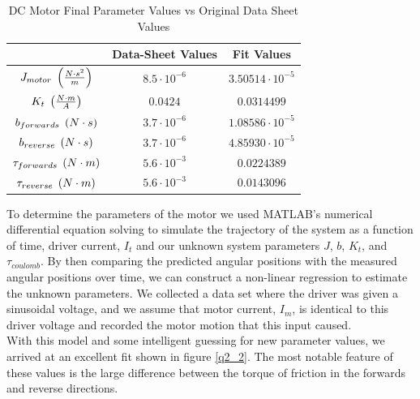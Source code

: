 \documentclass{article}
\theoremstyle{plain}
\theoremstyle{definition}
\theoremstyle{remark}
\begin{document}
\begin{table}[htb]
\begin{center}
    \begin{tabular}{|c|c|c|}
        \hline
        ~                 & Data-Sheet Values    & Fit Values              \\ \hline
        $J_{motor} \hspace{0.1cm} \left( \frac{N \cdot s^2}{m} \right)$               & $8.5 \cdot 10^{-6} $     & $3.50514 \cdot 10^{-5}$ \\ 
        $K_{t} \hspace{0.1cm} \left( \frac{N\cdot m}{A} \right)$           & $0.0424$             & $0.0314499$             \\ 
        $b_{forwards} \hspace{0.1cm} \left( N \cdot s \right)$    & $3.7 \cdot 10^{-6} $ & $1.08586 \cdot 10^{-5}$ \\ 
        $b_{reverse} \hspace{0.1cm} \left( N \cdot s \right)$     & $3.7 \cdot 10^{-6} $ & $4.85930 \cdot 10^{-5}$ \\ 
        $\tau_{forwards} \hspace{0.1cm} \left( N \cdot m \right)$ & $5.6 \cdot 10^{-3}$  & $0.0224389$             \\ 
        $\tau_{reverse} \hspace{0.1cm} \left( N \cdot m \right)$   & $5.6 \cdot 10^{-3}$  & $0.0143096$             \\
        \hline
    \end{tabular}
\caption{DC Motor Final Parameter Values vs Original Data Sheet Values}
\label{q2_1}
\end{center}
\end{table}

To determine the parameters of the motor we used MATLAB's numerical differential equation solving to simulate the trajectory of the system as a function of time, driver current, $I_t$ and our unknown system parameters $J$, $b$, $K_t$, and $\tau_{coulomb}$.  By then
comparing the predicted angular positions with the measured angular positions over time, we can construct a non-linear regression to estimate the unknown parameters.  We collected a data set where the driver was given a sinusoidal voltage, and we assume that motor current, $I_m$, is identical to this driver voltage and recorded the motor motion that this input caused. \\

With this model and some intelligent guessing for new parameter values, we arrived at an excellent fit shown in figure \ref{q2_2}. The most notable feature of these values is the large difference between the torque of friction in the forwards and reverse directions. \\ 
\end{document}
